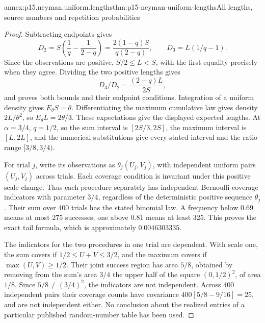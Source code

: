 \begin{annexitem}{annex:p15.neyman.uniform.lengths}{thm:p15-neyman-uniform-lengths}{All lengths, source numbers and repetition probabilities}
\begin{proof}
Subtracting endpoints gives
\[
 D_2=S\left(\frac1q-\frac1{2-q}\right)
       =\frac{2(1-q)S}{q(2-q)},\qquad
 D_3=L(1/q-1).
\]
Since the observations are positive,
\(S/2\leq L<S\), with the first equality precisely
when they agree. Dividing the two positive lengths gives
\[
                         D_3/D_2=\frac{(2-q)L}{2S},
\]
and proves both bounds and their endpoint conditions.
Integration of a uniform density gives \(E_\theta S=\theta\).
Differentiating the maximum cumulative law gives density
\(2L/\theta^2\), so \(E_\theta L=2\theta/3\).
These expectations give the displayed expected lengths.
At \(\alpha=3/4\), \(q=1/2\), so the sum interval is
\([2S/3,2S]\), the maximum interval is \([L,2L]\),
and the numerical substitutions give every stated interval
and the ratio range \([3/8,3/4)\).

For trial \(j\), write its observations as
\(\theta_j(U_j,V_j)\), with independent uniform pairs
\((U_j,V_j)\) across trials. Each coverage condition
is invariant under this positive scale change.
Thus each procedure separately has independent Bernoulli
coverage indicators with parameter \(3/4\), regardless
of the deterministic positive sequence \(\theta_j\).
Their sum over 400 trials has the stated binomial law.
A frequency below \(0.69\) means at most 275 successes;
one above \(0.81\) means at least 325. This proves
the exact tail formula, which is approximately
\(0.0046303335\).

The indicators for the two procedures in one trial
are dependent. With scale one, the sum covers if
\(1/2\leq U+V\leq3/2\), and the maximum covers if
\(\max(U,V)\geq1/2\). Their joint success region has
area \(5/8\), obtained by removing from the sum's
area \(3/4\) the upper half of the square
\((0,1/2)^2\), of area \(1/8\).
Since \(5/8\ne(3/4)^2\), the indicators are not
independent. Across 400 independent pairs their
coverage counts have covariance
\(400[5/8-9/16]=25\), and are not independent either.
No conclusion about the realized entries of a particular
published random-number table has been used.
\end{proof}
\end{annexitem}

